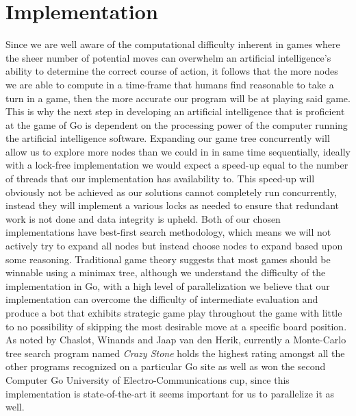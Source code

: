 \documentclass[conference]{IEEEtran}
\begin{document}
\section{Implementation}
Since we are well aware of the computational difficulty inherent in games where the sheer number of potential moves can overwhelm an artificial intelligence's ability to determine the correct course of action, it follows that the more nodes we are able to compute in a time-frame that humans find reasonable to take a turn in a game, then the more accurate our program will be at playing said game. This is why the next step in developing an artificial intelligence that is proficient at the game of Go is dependent on the processing power of the computer running the artificial intelligence software. Expanding our game tree concurrently will allow us to explore more nodes than we could in in same time sequentially, ideally with a lock-free implementation we would expect a speed-up equal to the number of threads that our implementation has availability to. This speed-up will obviously not be achieved as our solutions cannot completely run concurrently, instead they will implement a various locks as needed to ensure that redundant work is not done and data integrity is upheld. Both of our chosen implementations have best-first search methodology, which means we will not actively try to expand all nodes but instead choose nodes to expand based upon some reasoning. Traditional game theory suggests that most games should be winnable using a minimax tree, although we understand the difficulty of the implementation in Go, with a high level of parallelization we believe that our implementation can overcome the difficulty of intermediate evaluation and produce a bot that exhibits strategic game play throughout the game with little to no possibility of skipping the most desirable move at a specific board position. As noted by Chaslot, Winands and Jaap van den Herik, currently a Monte-Carlo tree search program named \textit{Crazy Stone} holds the highest rating amongst all the other programs recognized on a particular Go site as well as won the second Computer Go University of Electro-Communications cup, since this implementation is state-of-the-art it seems important for us to parallelize it as well.
\end{document}
